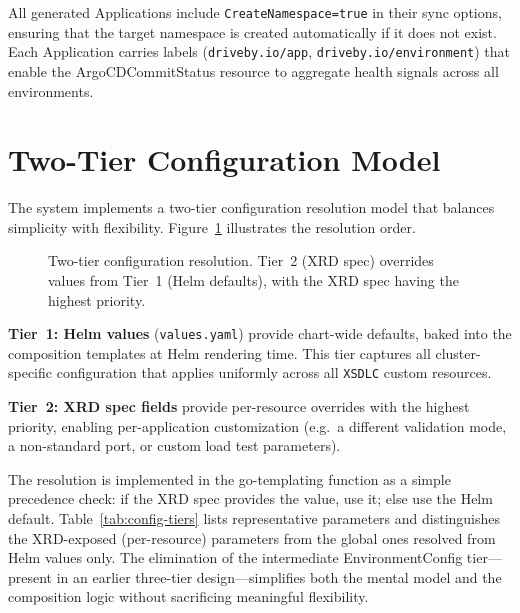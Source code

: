 All generated Applications include \texttt{CreateNamespace=true} in their sync options, ensuring that the target namespace is created automatically if it does not exist. Each Application carries labels (\texttt{driveby.io/app}, \texttt{driveby.io/environment}) that enable the ArgoCDCommitStatus resource to aggregate health signals across all environments.

\section{Two-Tier Configuration Model}
\label{sec:two-tier-config}

The system implements a two-tier configuration resolution model that balances simplicity with flexibility. Figure~\ref{fig:two-tier-config} illustrates the resolution order.

\begin{figure}[htbp]
\centering

\caption{Two-tier configuration resolution. Tier~2 (XRD spec) overrides values from Tier~1 (Helm defaults), with the XRD spec having the highest priority.}
\label{fig:two-tier-config}
\end{figure}

\textbf{Tier~1: Helm values} (\texttt{values.yaml}) provide chart-wide defaults, baked into the composition templates at Helm rendering time. This tier captures all cluster-specific configuration that applies uniformly across all \texttt{XSDLC} custom resources.

\textbf{Tier~2: XRD spec fields} provide per-resource overrides with the highest priority, enabling per-application customization (e.g.\ a different validation mode, a non-standard port, or custom load test parameters).

The resolution is implemented in the go-templating function as a simple precedence check: if the XRD spec provides the value, use it; else use the Helm default. Table~\ref{tab:config-tiers} lists representative parameters and distinguishes the XRD-exposed (per-resource) parameters from the global ones resolved from Helm values only. The elimination of the intermediate EnvironmentConfig tier---present in an earlier three-tier design---simplifies both the mental model and the composition logic without sacrificing meaningful flexibility.

